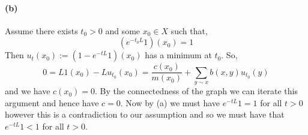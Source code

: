 \paragraph{(b)}

Assume there exists $t_{0}>0$ and some $x_{0}\in X$ such that,
\begin{equation*}
	(e^{-t_{0}L}1)(x_{0}) = 1
\end{equation*}
Then $u_{t}(x_{0}):=\left(1 - e^{-tL}1\right)(x_{0})$ has a minimum at $t_{0}$. So,
\begin{equation*}
	0 = L1(x_{0}) - Lu_{t_{0}}(x_{0}) = \frac{c(x_{0})}{m(x_{0})} + \sum_{y\sim x}b(x,y)u_{t_{0}}(y)
\end{equation*}
and we have $c(x_{0})=0$. By the connectedness of the graph we can iterate this argument and hence have $c=0$. Now by (a) we must have $e^{-tL}1=1$ for all $t>0$ however this is a contradiction to our assumption and so we must have that $e^{-tL}1<1$ for all $t>0$.
